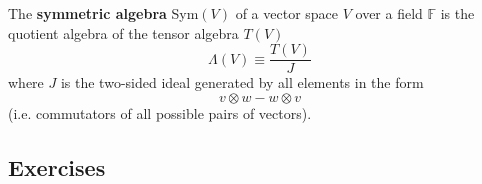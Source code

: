   \begin{definition}
    The \textbf{symmetric algebra} Sym$(V)$ of a vector space $V$ over a field $\mathbb{F}$ is the quotient algebra of the tensor algebra $T(V)$ 
    \begin{equation}
      \Lambda(V) \equiv \frac{T(V)}{J}
    \end{equation}
    where $J$ is the two-sided ideal generated by all elements in the form 
    \begin{equation}
      v \otimes w - w \otimes v
    \end{equation}
    (i.e. commutators of all possible pairs of vectors). 
  \end{definition}

\subsection{Exercises}
